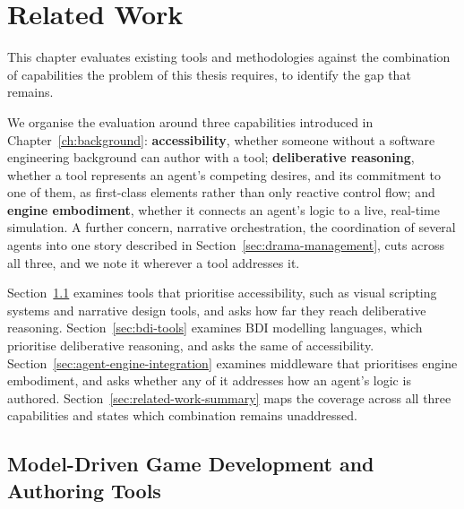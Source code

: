 \chapter{Related Work}
\label{ch:related_work}


This chapter evaluates existing tools and methodologies against the combination of capabilities the problem of this thesis requires, to identify the gap that remains.
 
We organise the evaluation around three capabilities introduced in Chapter~\ref{ch:background}: \textbf{accessibility}, whether someone without a software engineering background can author with a tool; \textbf{deliberative reasoning}, whether a tool represents an agent's competing desires, and its commitment to one of them, as first-class elements rather than only reactive control flow; and \textbf{engine embodiment}, whether it connects an agent's logic to a live, real-time simulation. A further concern, narrative orchestration, the coordination of several agents into one story described in Section~\ref{sec:drama-management}, cuts across all three, and we note it wherever a tool addresses it.
 
Section~\ref{sec:game-authoring-tools} examines tools that prioritise accessibility, such as visual scripting systems and narrative design tools, and asks how far they reach deliberative reasoning. Section~\ref{sec:bdi-tools} examines BDI modelling languages, which prioritise deliberative reasoning, and asks the same of accessibility. Section~\ref{sec:agent-engine-integration} examines middleware that prioritises engine embodiment, and asks whether any of it addresses how an agent's logic is authored. Section~\ref{sec:related-work-summary} maps the coverage across all three capabilities and states which combination remains unaddressed.
 
 
\section{Model-Driven Game Development and Authoring Tools}
\label{sec:game-authoring-tools}
 
 
